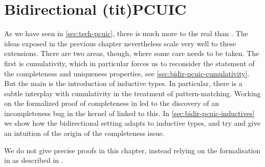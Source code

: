 \chapter{Bidirectional \kl(tit){PCUIC}}
\label{chap:bidir-pcuic}

\margintoc

As we have seen in \cref{sec:tech-pcuic}, there is much more to the real  than
.
The ideas exposed in the previous chapter nevertheless
scale very well to these extensions.
There are two areas, though, where some care needs to be taken.
The first is cumulativity, which in particular forces us to reconsider the statement
of the completeness and uniqueness properties, see \cref{sec:bidir-pcuic-cumulativity}.
But the main is the introduction of inductive types. In particular, there is a subtle
interplay with cumulativity in the treatment of pattern-matching.
Working on the formalized proof of completeness in  led to the discovery of
an incompleteness bug in the kernel of  linked to this.
In \cref{sec:bidir-pcuic-inductives} we show how the bidirectional setting adapts to
inductive types, and try and give an intuition of the origin of the completeness issue.

We do not give precise proofs in this chapter,
instead relying on the formalisation in  as described in .


  
